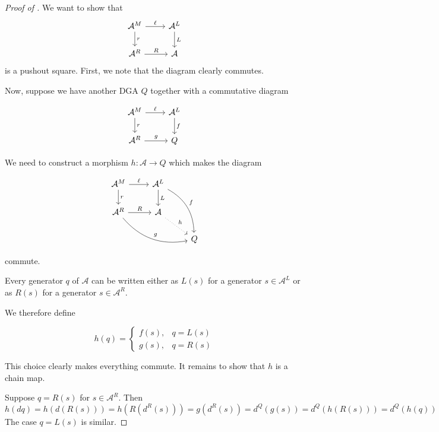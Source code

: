 \documentclass[a4paper,final, reqno]{amsart}
\theoremstyle{plain}
\theoremstyle{definition}
\newcommand{\A}{\mathcal{A}}
\begin{document}
	
	
	\begin{proof}[Proof of ]
		We want to show that
		\[\begin{tikzcd}
			\A^M \arrow[r, "\ell"] \arrow[d, "r"] & \A^L \arrow[d, "L"] \\
			\A^R \arrow[r, "R"]           & \A
		\end{tikzcd} \]
		is a pushout square. First, we note that the diagram clearly commutes.
		
		Now, suppose we have another DGA $Q$ together with a commutative diagram
		
		\[\begin{tikzcd}
			\A^M \arrow[r, "\ell"] \arrow[d, "r"] & \A^L \arrow[d, "f"] \\
			\A^R \arrow[r, "g"]           & Q
		\end{tikzcd} \]
		
		We need to construct a morphism $h: \A \to Q$ which makes the diagram 
		
		\[\begin{tikzcd}
			\A^M \arrow[r, "\ell"] \arrow[d, "r"]          & \A^L \arrow[d, "L"] \arrow[rdd, bend left, "f"] &   \\
			\A^R \arrow[r, "R"] \arrow[rrd, bend right, "g"] & \A \arrow[rd, dotted, "h"]               &   \\
			&                                    & Q
		\end{tikzcd} \]
		
		commute.
		
		Every generator $q$ of $\A$ can be written either as $L(s)$ for a generator $s \in \A^L$ or as $R(s)$ for a generator $s \in \A^R$. 
		
		We therefore define
		
		\[ h(q) = \begin{cases}
			f(s), & q = L(s) \\
			g(s), & q = R(s) 
		\end{cases}\]
		
		This choice clearly makes everything commute. It remains to show that $h$ is a chain map.
		
		Suppose $q = R(s)$ for $s\in \A^R$. Then 
		\begin{equation*}
			h(dq) = h(d(R(s))) = h(R(d^R(s))) = g(d^R(s)) = d^Q(g(s)) = d^Q(h(R(s))) = d^Q(h(q))
		\end{equation*}
		The case $q = L(s)$ is similar. 
		
	\end{proof}
	
\end{document}
